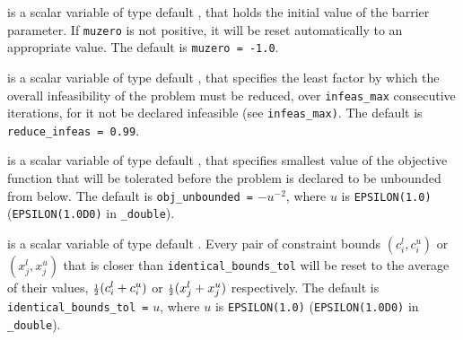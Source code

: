 \begin{description}
  is a scalar variable of type default \realdp, that holds the
initial value of the barrier parameter. If {\tt muzero} is
not positive, it will be reset automatically to an appropriate value.
The default is {\tt muzero = -1.0}.

  is a scalar variable of type default
\realdp, that specifies the
least factor by which the overall infeasibility of the problem must be reduced,
over {\tt infeas\_max} consecutive iterations,
for it not be declared infeasible (see {\tt infeas\_max)}.
The default is {\tt reduce\_infeas = 0.99}.

  is a scalar variable of type default
\realdp, that specifies smallest
value of the objective function that will be tolerated before the problem
is declared to be unbounded from below.
The default is {\tt obj\_u\-nbounded =} $-u^{-2}$,
where $u$ is {\tt EPSILON(1.0)} ({\tt EPSILON(1.0D0)} in
{\tt \fullpackagename\_double}).




is a scalar variable of type default \realdp.
Every pair of constraint bounds
$(c_{i}^{l}, c_{i}^{u})$ or $(x_{j}^{l}, x_{j}^{u})$
that is closer than {\tt identical\_bounds\_tol}
will be reset to the average of their values,
${\scriptstyle \frac{1}{2}} (c_{i}^{l} + c_{i}^{u})$ or ${\scriptstyle \frac{1}{2}} (x_{j}^{l} + x_{j}^{u})$
respectively.
The default is {\tt identical\_bounds\_tol =} $u$,
where $u$ is {\tt EPSILON(1.0)} ({\tt EPSILON(1.0D0)} in
{\tt \fullpackagename\_double}).


\end{description}
